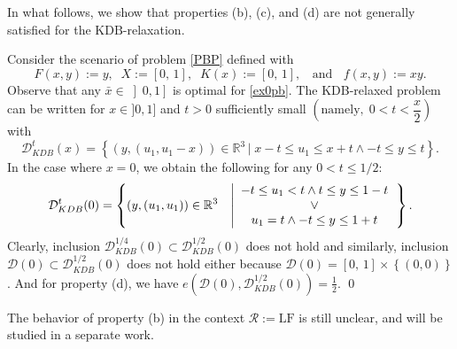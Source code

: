 In what follows, we show that properties (b), (c), and (d) are not generally satisfied for the $\mbox{KDB}$-relaxation. 
\begin{example}
Consider the scenario of problem \eqref{PBP} defined  with 
\begin{equation}\label{ex0pb}
F(x,y):=y, \;\; X:=[0, \, 1], \;\; K(x):=[0, \, 1], \;\; \mbox{ and }\;\; f(x,y):= xy.
\end{equation}
Observe that  any $\bar{x}\in\left]  0,1\right]$ is optimal for  \eqref{ex0pb}.
  {The KDB-relaxed problem  can be written  for $x \in ]0,1] $ and $ t>0$ sufficiently small $\left(\text{namely},\; 0 < t < \dfrac{x}{2}\right)$  with }   
\[
\mathcal{D}_{KDB}^{t}(x)=\left\{(y,(u_{1},u_{1}-x))\in\mathbb{R}^{3}\,\left\vert\;
x-t\leq u_{1}\leq x+t\wedge -t\leq y\leq t\right.\right\}.
\]
In the case where $x = 0$, we obtain the following for any $0<t\leq 1/2$: 
\[
\mathcal{D}_{KDB}^{t}(0)=\left\{  (y,(u_{1},u_{1}))\in\mathbb{R}
^{3}\,\ \ \left\vert
\begin{array}
[c]{c}
-t\leq u_{1} < t\wedge t\leq y\leq 1- t\\
\vee\\
u_{1} =t \wedge -t\leq y\leq 1+ t
\end{array}
\right.  \right\}.
\]
Clearly, inclusion $\mathcal{D}_{KDB}^{1/4}(0) \subset \mathcal{D}_{KDB}^{1/2}(0)$ does not hold and similarly, inclusion $\mathcal{D}(0) \subset \mathcal{D}_{KDB}^{1/2}(0)$ does not hold either because  $\mathcal{D}(0)=[0, \, 1]\times \left\{(0,0) \right\}$. And for property (d), we have 
$e\left(\mathcal{D}(0),\mathcal{D}^{1/2}_{KDB}(0)\right)=\frac{1}{2}$. \hfill \qed 
\end{example}
The behavior of  property (b) in the context $\mathcal{R} := \mbox{LF}$  is still unclear, and will be studied in a separate work.  




